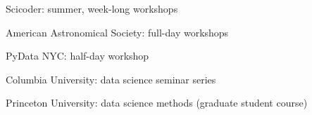 \documentclass[letterpaper,12pt]{deedy-resume} %
\begin{document}
\begin{minipage}[t]{0.64\textwidth}





\begin{tightitemize}
    \item Scicoder: summer, week-long workshops
    \item American Astronomical Society: full-day workshops
    \item PyData NYC: half-day workshop
    \item Columbia University: data science seminar series
    \item Princeton University: data science methods (graduate student course)
\end{tightitemize}







\end{minipage} %
\end{document}
